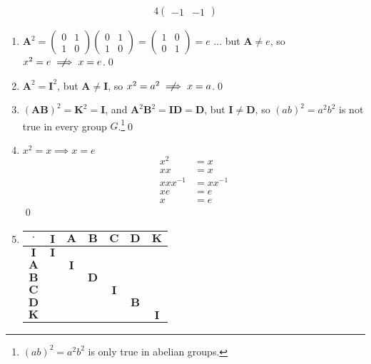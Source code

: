 \begin{enumerate}[label={\Alph*.},font={\bfseries}]
\begin{alignat*}{4}
\begin{pmatrix}
      -1 & -1
    \end{pmatrix}
  \end{alignat*}
  \begin{enumerate}[label={\arabic*},font={\bfseries}]
  \item
    \(
      \mathbf{A}^2 =
      \begin{pmatrix}
        0 & 1 \\
        1 & 0
      \end{pmatrix}
      \begin{pmatrix}
        0 & 1 \\
        1 & 0
      \end{pmatrix}
      =
      \begin{pmatrix}
        1 & 0 \\
        0 & 1
      \end{pmatrix}
      = e
    \)
    ... but $\mathbf{A} \ne e$, so $x^2 = e \centernot\implies x = e$.\qed
  \item $\mathbf{A}^2 = \mathbf{I}^2$, but $\mathbf{A} \ne \mathbf{I}$, so $x^2 = a^2 \centernot\implies x = a$.\qed
  \item $(\mathbf{A}\mathbf{B})^2 = \mathbf{K}^2 = \mathbf{I}$, and $\mathbf{A}^2\mathbf{B}^2 = \mathbf{I}\mathbf{D} = \mathbf{D}$, but $\mathbf{I} \ne \mathbf{D}$, so $(ab)^2 = a^2b^2$ is not true in every group $G$.\footnote{$(ab)^2 = a^2b^2$ is only true in abelian groups.}\qed
  \item $x^2 = x \implies x = e$
    \begin{align*}
      x^2 &= x \\
      xx &= x \\
      xxx^{-1} &= xx^{-1} \\
      xe &= e \\
      x &= e
    \end{align*}
    \qed
  \item
    \begin{tabular}{ c | c c c c c c}
      $\cdot$ & $\mathbf{I}$ & $\mathbf{A}$ & $\mathbf{B}$ & $\mathbf{C}$ & $\mathbf{D}$ & $\mathbf{K}$ \\
      \hline
      $\mathbf{I}$ & $\mathbf{I}$ \\
      $\mathbf{A}$ & & $\mathbf{I}$ \\
      $\mathbf{B}$ & & & $\mathbf{D}$ \\
      $\mathbf{C}$ & & & & $\mathbf{I}$ \\
      $\mathbf{D}$ & & & & & $\mathbf{B}$ \\
      $\mathbf{K}$ & & & & & & $\mathbf{I}$
    \end{tabular}


\end{enumerate}
\end{enumerate}
